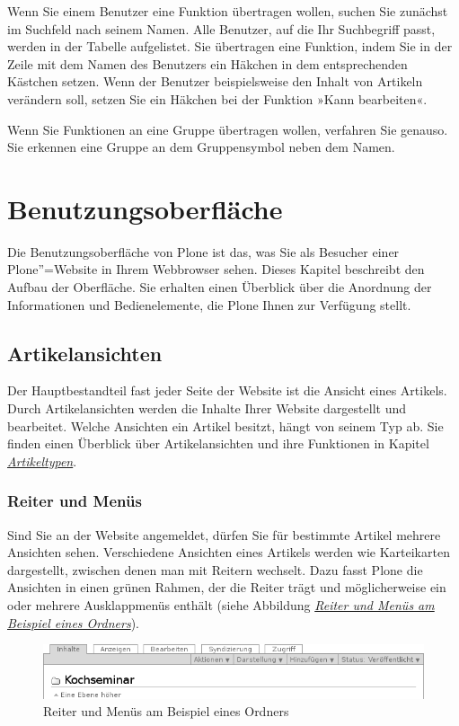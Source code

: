 \documentclass[a4paper,12pt,ngerman]{manual}
\begin{document}
Wenn Sie einem Benutzer eine Funktion übertragen wollen, suchen Sie zunächst
im Suchfeld nach seinem Namen. Alle Benutzer, auf die Ihr Suchbegriff passt,
werden in der Tabelle aufgelistet. Sie übertragen eine Funktion, indem Sie
in der Zeile mit dem Namen des Benutzers ein Häkchen in dem entsprechenden
Kästchen setzen. Wenn der Benutzer beispielsweise den Inhalt von Artikeln
verändern soll, setzen Sie ein Häkchen bei der Funktion »Kann bearbeiten«.

Wenn Sie Funktionen an eine Gruppe übertragen wollen, verfahren Sie
genauso. Sie erkennen eine Gruppe an dem Gruppensymbol neben dem Namen.

\resetcurrentobjects
\hypertarget{--doc-oberflaeche/oberflaeche}{}

\hypertarget{sec-ui}{}\chapter{Benutzungsoberfläche}

Die Benutzungsoberfläche von Plone ist das, was Sie als Besucher einer
Plone''=Website in Ihrem Webbrowser sehen. Dieses Kapitel beschreibt den
Aufbau der Oberfläche. Sie erhalten einen Überblick über die Anordnung der
Informationen und Bedienelemente, die Plone Ihnen zur Verfügung stellt.

\resetcurrentobjects
\hypertarget{--doc-oberflaeche/ansichten}{}

\section{Artikelansichten}

Der Hauptbestandteil fast jeder Seite der Website ist die Ansicht eines
Artikels. Durch Artikelansichten werden die Inhalte Ihrer Website dargestellt
und bearbeitet. Welche Ansichten ein Artikel besitzt, hängt von seinem Typ
ab. Sie finden einen Überblick über Artikelansichten und ihre Funktionen in
Kapitel \hyperlink{sec-inhaltstypen}{\emph{Artikeltypen}}.


\hypertarget{sec-ui-rahmen}{}\subsection{Reiter und Menüs}

Sind Sie an der Website angemeldet, dürfen Sie für bestimmte Artikel mehrere
Ansichten sehen. Verschiedene Ansichten eines Artikels werden wie Karteikarten
dargestellt, zwischen denen man mit Reitern wechselt. Dazu fasst Plone die
Ansichten in einen grünen Rahmen, der die Reiter trägt und möglicherweise
ein oder mehrere Ausklappmenüs enthält (siehe
Abbildung \hyperlink{fig-ui-rahmen}{\emph{Reiter und Menüs am Beispiel eines Ordners}}).
\hypertarget{fig-ui-rahmen}{}\begin{figure}[htbp]
\centering

\includegraphics{rahmen.png}
\caption{Reiter und Menüs am Beispiel eines Ordners}\end{figure}
\end{document}
